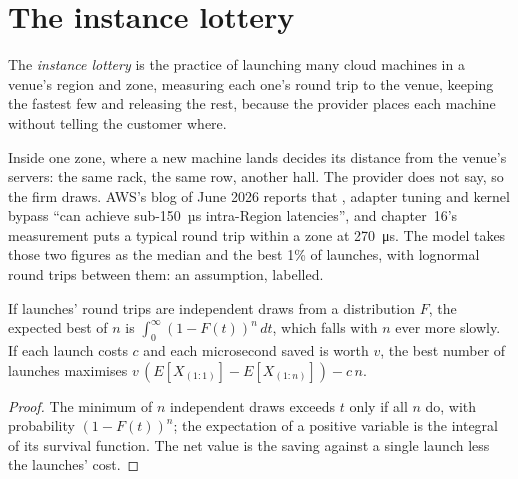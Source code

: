 \label{lst:nw:where-the-crypto-venues-live:tri}

\section{The instance lottery}

\begin{definition}\label{def:nw:where-the-crypto-venues-live:lottery}
The \emph{instance lottery} is the practice of launching many cloud machines in a venue's region and zone, measuring each
one's round trip to the venue, keeping the fastest few and releasing the rest, because the provider places each machine without telling the
customer where.
\end{definition}

Inside one zone, where a new machine lands decides its distance from the venue's servers: the same rack, the same row, another hall. The
provider does not say, so the firm draws. AWS's blog of June 2026 reports that , adapter tuning and kernel bypass ``can achieve
sub-150~µs intra-Region latencies'', and chapter~16's measurement puts a typical round trip within a zone at \qty{270}{\micro\second}. The model
takes those two figures as the median and the best 1\% of launches, with lognormal round trips between them: an assumption, labelled.

\begin{proposition}[Best of $n$]\label{prop:nw:where-the-crypto-venues-live:bestn}
If launches' round trips are independent draws from a distribution $F$, the expected best of $n$ is $\int_0^\infty (1 - F(t))^n\,dt$, which falls
with $n$ ever more slowly. If each launch costs $c$ and each microsecond saved is worth $v$, the best number of launches maximises
$v\,(E[X_{(1:1)}] - E[X_{(1:n)}]) - c\,n$.
\end{proposition}

\begin{proof}
The minimum of $n$ independent draws exceeds $t$ only if all $n$ do, with probability $(1-F(t))^n$; the expectation of a positive variable is the
integral of its survival function. The net value is the saving against a single launch less the launches' cost.
\end{proof}

